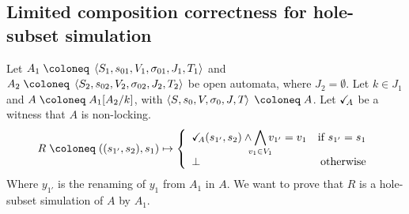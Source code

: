 \documentclass{article}
\begin{document}
\subsection{Limited composition correctness for hole-subset simulation}\label{apx:lchs}
Let \(A_1 \defobject \OAg[1]\) and \(A_2 \defobject \OAg[2]\) be open automata, where \(J_2 = \emptyset\).
Let \(k \in J_1\) and \(A \defobject A_1\subst{A_2}{k}\), with \(\OAg \defobject A\).
Let \(\checkmark_{\!\! A}\) be a witness that \(A\) is non-locking.
\[ R \defobject \mpar{\mpar{s_{1'}, s_2}, s_1} \mapsto \choice{\reach{A}\mpar{s_{1'}, s_2} \wedge \bigwedge_\subbox{v_1 \in V_1} v_{1'} = v_1 & \text{if } s_{1'} = s_1 \\ \bot & \text{otherwise}} \]
Where \(y_{1'}\) is the renaming of \(y_1\) from \(A_1\) in \(A\).
We want to prove that \(R\) is a hole-subset simulation of \(A\) by \(A_1\).
\end{document}
